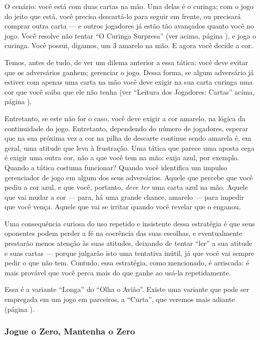 \label{aviaolongo}

O cenário: você está com duas cartas na mão. Uma delas é o curinga; com o jogo do jeito que está, você precisa descartá-lo para seguir em frente, ou precisará comprar outra carta --- e outros jogadores já estão tão avançados quanto você no jogo. Você resolve não tentar ``O Curinga Surpresa'' (ver acima, página \pageref{curingasurpresa}), e joga o curinga. Você possui, digamos, um 3 amarelo na mão. E agora você decide a cor.

Temos, antes de tudo, de ver um dilema anterior a essa tática: você deve evitar que os adversários ganhem; gerenciar o jogo. Dessa forma, se algum adversário já estiver com apenas uma carta na mão você deve exigir na sua carta curinga uma cor que você saiba que ele não tenha (ver ``Leitura dos Jogadores: Cartas'' acima, página \pageref{leituradosjogadorescartas}).

Entretanto, se este não for o caso, você deve exigir a cor amarelo, na lógica da continuidade do jogo. Entretanto, dependendo do número de jogadores, esperar que na sua próxima vez a cor na pilha de descarte continue sendo amarela é, em geral, uma atitude que leva à frustração. Uma tática que parece uma aposta cega é exigir uma outra cor, não a que você tem na mão: exija azul, por exemplo. Quando a tática costuma funcionar? Quando você identifica um impulso gerenciador de jogo em algum dos seus adversários. Aquele que percebe que você pediu a cor azul, e que você, portanto, \textit{deve ter} uma carta azul na mão. Aquele que vai mudar a cor --- para, há uma grande chance, amarelo --- para impedir que você vença. Aquele que vai se irritar quando você revelar que o enganou.

Uma consequência curiosa do uso repetido e insistente dessa estratégia é que seus oponentes podem perder a fé na coerência das suas escolhas, e eventualmente prestarão menos atenção às suas atitudes, deixando de tentar ``ler'' a sua atitude e suas cartas --- porque julgarão isto uma tentativa inútil, já que você vai sempre pedir o que não tem. Contudo, essa estratégia, como mencionado, é arriscada: é mais provável que você perca mais do que ganhe ao usá-la repetidamente.

Essa é a variante ``Longa'' do ``Olha o Avião''. Existe uma variante que pode ser empregada em um jogo em parceiros, a ``Curta'', que veremos mais adiante (página \pageref{aviaocurto}).

\subsubsection{Jogue o Zero, Mantenha o Zero}


